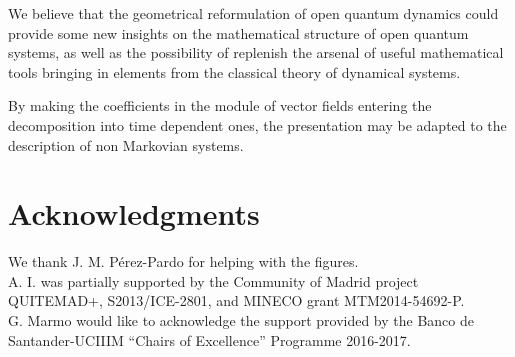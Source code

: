 \documentclass[11pt]{article}
\begin{document}
We believe that the geometrical reformulation of open quantum dynamics could provide some new insights on the mathematical structure of open quantum systems, as well as the possibility of replenish the arsenal of useful mathematical tools bringing in elements from the classical theory of dynamical systems.

By making the coefficients in the module of vector fields entering the decomposition into time dependent ones, the presentation may be adapted to the description of non Markovian systems.


\section*{Acknowledgments}
We thank J. M. P\'{e}rez-Pardo for helping with the figures.\\
A. I. was partially supported by the Community of Madrid project QUITEMAD+, S2013/ICE-2801, and MINECO grant MTM2014-54692-P.\\
G. Marmo would like to acknowledge the support provided by the Banco de Santander-UCIIIM ``Chairs of Excellence'' Programme 2016-2017.
\end{document}
